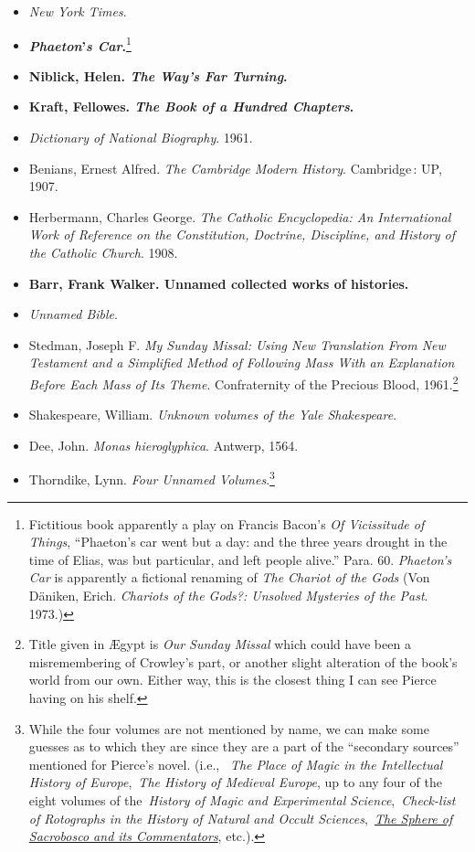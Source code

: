\documentclass[12pt]{article}
\providecommand{\tightlist}{%
  \setlength{\itemsep}{0pt}\setlength{\parskip}{0pt}}
\begin{document}
\begin{itemize}
\tightlist
\item
  \emph{New York Times}.
\item
  \textbf{\emph{Phaeton}'\emph{s Car}.}\footnote{Fictitious book apparently a play on Francis Bacon's \emph{Of Vicissitude of Things}, ``Phaeton's car went but a day: and the three years drought in the time of Elias, was but particular, and left people alive.'' Para. 60. \emph{Phaeton's Car} is apparently a fictional renaming of \emph{The Chariot of the Gods} (Von Däniken, Erich. \emph{Chariots of the Gods?: Unsolved Mysteries of the Past}. 1973.)}
\item
  \textbf{Niblick, Helen. \emph{The Way's Far Turning}.}
\item
  \textbf{Kraft, Fellowes. \emph{The Book of a Hundred Chapters}.}
\item
  \emph{Dictionary of National Biography}. 1961.
\item
  Benians, Ernest Alfred. \emph{The Cambridge Modern History}. Cambridge\,: UP, 1907.
\item
  Herbermann, Charles George. \emph{The Catholic Encyclopedia: An International Work of Reference on the Constitution, Doctrine, Discipline, and History of the Catholic Church}. 1908.
\item
  \textbf{Barr, Frank Walker. Unnamed collected works of histories.}
\item
  \emph{Unnamed Bible}.
\item
  Stedman, Joseph F. \emph{My Sunday Missal: Using New Translation From New Testament and a Simplified Method of Following Mass With an Explanation Before Each Mass of Its Theme}. Confraternity of the Precious Blood, 1961.\footnote{Title given in Ægypt is \emph{Our Sunday Missal} which could have been a misremembering of Crowley's part, or another slight alteration of the book's world from our own. Either way, this is the closest thing I can see Pierce having on his shelf.}
\item
  Shakespeare, William. \emph{Unknown volumes of the Yale Shakespeare}.
\item
  Dee, John. \emph{Monas hieroglyphica}. Antwerp, 1564.
\item
  Thorndike, Lynn. \emph{Four Unnamed Volumes}.\footnote{While the four volumes are not mentioned by name, we can make some guesses as to which they are since they are a part of the ``secondary sources'' mentioned for Pierce's novel. (i.e., ~\emph{The Place of Magic in the Intellectual History of Europe},~\emph{The History of Medieval Europe}, up to any four of the eight volumes of the~\emph{History of Magic and Experimental Science},~\emph{Check-list of Rotographs in the History of Natural and Occult Sciences},~\emph{\href{http://hdl.handle.net/2027/mdp.39015025028716}{\textit{The Sphere of Sacrobosco and its Commentators}}}, etc.).}

\end{itemize}
\end{document}
